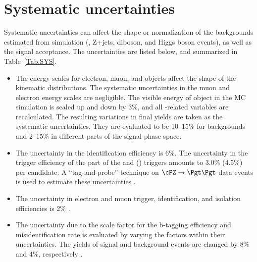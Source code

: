\section{Systematic uncertainties}
\label{sect:sys}
Systematic uncertainties can affect the shape or normalization of the
backgrounds estimated from simulation (\ttbar, Z+jets, diboson, and Higgs boson events), 
as well as the signal acceptance. 
The uncertainties are listed below, and summarized in Table~\ref{Tab.SYS}.

\begin{itemize}


\item  The energy scales for electron, muon, and \Tau objects affect the shape of the kinematic distributions.
 The systematic uncertainties in the muon and electron energy scales are negligible.
The visible energy of \Tau object in the MC simulation is scaled up and down
by 3\%, and all \Tau-related variables are recalculated. The resulting variations in
final yields are taken as the systematic uncertainties. They are evaluated to be 10--15\% for 
backgrounds and 2--15\% in different parts of the signal phase space.



\item The uncertainty in the \Tau identification efficiency is 6\%. 
  The uncertainty in the trigger efficiency of the \Tau part of the \eTau and
  \muTau (\tauTau) triggers amounts to 3.0\% (4.5\%) per \Tau candidate.
  A ``tag-and-probe'' technique \cite{Chatrchyan:2014mua} on $\cPZ\to \Pgt\Pgt$ data events is used to estimate these 
  uncertainties \cite{Khachatryan:2014wca}.


\item The uncertainty in electron and muon trigger, identification, and
  isolation efficiencies is 2\% \cite{Khachatryan:2014wca}.


\item The uncertainty due to the scale factor for the b-tagging efficiency and misidentification 
rate is evaluated by varying the factors within their uncertainties. The yields of signal and background events are changed by 8\% 
and 4\%, respectively \cite{Chatrchyan:2012jua}.
 

\end{itemize}

